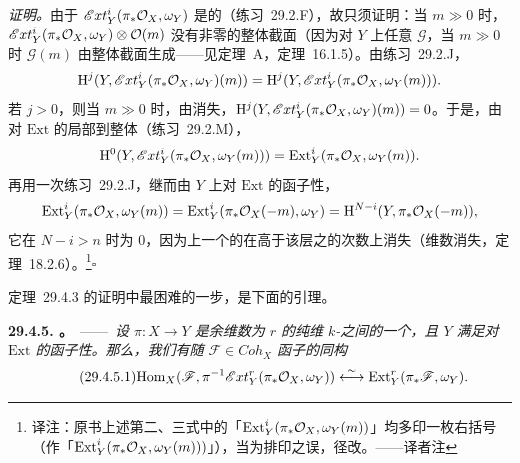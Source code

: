 \emph{证明。}\quad 由于 $\mathscr{E}xt^i_Y(\pi_*\mathcal{O}_X,\omega_Y)$ 是\trCoh{}的（\mbox{练习~29.2.F}），故只须证明：当 $m\gg 0$ 时，$\mathscr{E}xt^i_Y(\pi_*\mathcal{O}_X,\omega_Y)\otimes\mathcal{O}(m)$ 没有非零的整体截面（因为对 $Y$ 上任意\trCoherentSheaf{} $\mathscr{G}$，当 $m\gg 0$ 时 $\mathscr{G}(m)$ 由整体截面生成——见\trSerre{}定理~A，\mbox{定理~16.1.5}）。由\mbox{练习~29.2.J}，
\[
\mathrm{H}^j(Y,\mathscr{E}xt^i_Y(\pi_*\mathcal{O}_X,\omega_Y)(m))=\mathrm{H}^j(Y,\mathscr{E}xt^i_Y(\pi_*\mathcal{O}_X,\omega_Y(m))).
\]
若 $j>0$，则当 $m\gg 0$ 时，由\trSerre{}消失，$\mathrm{H}^j(Y,\mathscr{E}xt^i_Y(\pi_*\mathcal{O}_X,\omega_Y)(m))=0$。于是，由对 $\mathrm{Ext}$ 的局部到整体\trSpectralSequence（\mbox{练习~29.2.M}），
\[
\mathrm{H}^0(Y,\mathscr{E}xt^i_Y(\pi_*\mathcal{O}_X,\omega_Y(m)))=\mathrm{Ext}^i_Y(\pi_*\mathcal{O}_X,\omega_Y(m)).
\]
再用一次\mbox{练习~29.2.J}，继而由 $Y$ 上对 $\mathrm{Ext}$ 的函子性\trSerreDuality，
\[
\mathrm{Ext}^i_Y(\pi_*\mathcal{O}_X,\omega_Y(m))=\mathrm{Ext}^i_Y(\pi_*\mathcal{O}_X(-m),\omega_Y)=\mathrm{H}^{N-i}(Y,\pi_*\mathcal{O}_X(-m)),
\]
它在 $N-i>n$ 时为 $0$，因为\trProjective\trScheme{}上一个\trQCSheaf{}的\trCohomology{}在高于该层\trSupport{}之\trDimension{}的次数上消失（维数\trCohomology{}消失，\mbox{定理~18.2.6}）。\footnote{译注：原书上述第二、三式中的「$\mathrm{Ext}^i_Y(\pi_*\mathcal{O}_X,\omega_Y(m))$」均多印一枚右括号（作「$\mathrm{Ext}^i_Y(\pi_*\mathcal{O}_X,\omega_Y(m)))$」），当为排印之误，径改。——译者注}\hfill$\square$

\mbox{定理~29.4.3} 的证明中最困难的一步，是下面的引理。

\textbf{29.4.5. \trhLemma。}\ ——\ \emph{设 $\pi\colon X\to Y$ 是余维数为 $r$ 的纯维\trProjective{} $k$-\trScheme{}之间的一个\trClosedEmbedding，且 $Y$ 满足对 $\mathrm{Ext}$ 的函子性\trSerreDuality。那么，我们有随 $\mathscr{F}\in\mathit{Coh}_X$ 函子的同构}
\begin{equation*}
\tag{29.4.5.1}\label{eq:hom-ext-iso-lemma}
\mathrm{Hom}_X(\mathscr{F},\pi^{-1}\mathscr{E}xt^r_Y(\pi_*\mathcal{O}_X,\omega_Y))\overset{\sim}{\longleftrightarrow}\mathrm{Ext}^r_Y(\pi_*\mathscr{F},\omega_Y).
\end{equation*}

